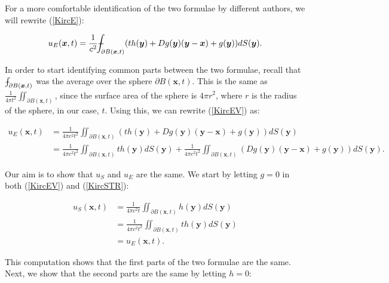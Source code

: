 \documentclass[a4paper, 12pt]{article}
\def\Xint#1{\mathchoice
{\XXint\displaystyle\textstyle{#1}}%
{\XXint\textstyle\scriptstyle{#1}}%
{\XXint\scriptstyle\scriptscriptstyle{#1}}%
{\XXint\scriptscriptstyle\scriptscriptstyle{#1}}%
\!\int}
\def\XXint#1#2#3{{\setbox0=\hbox{$#1{#2#3}{\int}$ }
\vcenter{\hbox{$#2#3$ }}\kern-.6\wd0}}
\def\dashint{\Xint-}
\numberwithin{equation}{section}
\begin{document}
For a more comfortable identification of the two formulae by different authors,
we will rewrite (\ref{KircE}): 

\begin{equation} \label{KircEV}
    u_E(\boldsymbol{x},t)=\frac{1}{c^2}\dashint_{\partial B(\boldsymbol{x},t)}(th(\boldsymbol{y})+Dg(\boldsymbol{y})(\boldsymbol{y}-\boldsymbol{x})+g(\boldsymbol{y}))dS(\boldsymbol{y}).
\end{equation}

In order to start identifying common parts between the two formulae, recall that
$\dashint_{\partial B(\boldsymbol{x}, t)}$ was the average over the sphere
$\partial B(\boldsymbol{x}, t)$. This is the same as $\frac{1}{4 \pi
t^2}\iint_{\partial B(\boldsymbol{x}, t)}$, since the surface area of the sphere
is $4\pi r^2$, where $r$ is the radius of the sphere, in our case, $t$. Using
this, we can rewrite (\ref{KircEV}) as:

\begin{equation*}
    \begin{aligned}
    u_E(\boldsymbol{x},t)&=\frac{1}{4 \pi c^2 t^2}\iint_{\partial B(\boldsymbol{x},t)} (th(\boldsymbol{y})+Dg(\boldsymbol{y})(\boldsymbol{y}-\boldsymbol{x})+g(\boldsymbol{y}))dS(\boldsymbol{y})\\ 
    &=\frac{1}{4 \pi c^2 t^2}\iint_{\partial B(\boldsymbol{x},t)} th(\boldsymbol{y})dS(\boldsymbol{y})+\frac{1}{4 \pi c^2 t^2}\iint_{\partial B(\boldsymbol{x},t)}(Dg(\boldsymbol{y})(\boldsymbol{y}-\boldsymbol{x})+g(\boldsymbol{y}))dS(\boldsymbol{y}).
    \end{aligned}
\end{equation*}

Our aim is to show that $u_S$ and $u_E$ are the same. We start by letting $g=0$
in both (\ref{KircEV}) and (\ref{KircSTR}):

\begin{equation} \label{g=0}
    \begin{aligned}
        u_S(\boldsymbol{x}, t)&=\frac{1}{4\pi c^2 t}\iint_{\partial B(\boldsymbol{x}, t)}h(\boldsymbol{y})dS(\boldsymbol{y})\\
        &=\frac{1}{4\pi c^2 t^2}\iint_{\partial B(\boldsymbol{x}, t)}th(\boldsymbol{y})dS(\boldsymbol{y})\\
        &=u_E(\boldsymbol{x}, t).
    \end{aligned}
\end{equation}

This computation shows that the first parts of the two formulae are the same.
Next, we show that the second parts are the same by letting $h=0$:
\end{document}
